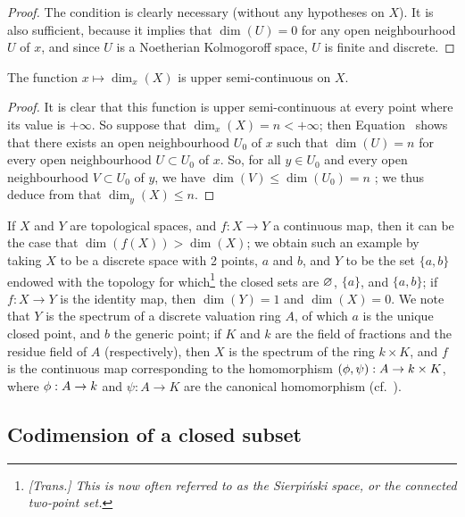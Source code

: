 \begin{proof}
The condition is clearly necessary (without any hypotheses on $X$).
It is also sufficient,
because it implies that $\dim(U)=0$ for any open neighbourhood $U$ of $x$, and since $U$ is a Noetherian Kolmogoroff space, $U$ is finite and discrete.
\end{proof}

\begin{proposition}[14.1.11]
\label{0.14.1.11}
The function $x\mapsto\dim_x(X)$ is upper semi-continuous on $X$.
\end{proposition}

\begin{proof}
It is clear that this function is upper semi-continuous at every point where its value is $+\infty$.
So suppose that $\dim_x(X)=n<+\infty$;
then Equation~ shows that there exists an open neighbourhood $U_0$ of $x$ such that $\dim(U)=n$ for every open neighbourhood $U\subset U_0$ of $x$.
So, for all $y\in U_0$ and every open neighbourhood $V\subset U_0$ of $y$, we have $\dim(V)\leq\dim(U_0)=n$ ;
we thus deduce from  that $\dim_y(X)\leq n$.
\end{proof}

\begin{remark}[14.1.12]
\label{0.14.1.12}
If $X$ and $Y$ are topological spaces, and $f:X\to Y$ a continuous map, then it can be the case that $\dim(f(X))>\dim(X)$;
we obtain such an example by taking $X$ to be a discrete space with 2 points, $a$ and $b$, and $Y$ to be the set $\{a,b\}$ endowed with the topology for which\footnote{\emph{[Trans.] This is now often referred to as the \emph{Sierpi\'nski space}, or the \emph{connected two-point set}.}} the closed sets are $\varnothing$, $\{a\}$, and $\{a,b\}$;
if $f:X\to Y$ is the identity map, then $\dim(Y)=1$ and $\dim(X)=0$.
We note that $Y$ is the spectrum of a discrete valuation ring $A$, of which $a$ is the unique closed point, and $b$ the generic point;
if $K$ and $k$ are the field of fractions and the residue field of $A$ (respectively), then $X$ is the spectrum of the ring $k\times K$, and $f$ is the continuous map corresponding to the homomorphism $(\vphi,\psi):A\to k\times K$, where $\vphi:A\to k$ and $\psi:A\to K$ are the canonical homomorphism (cf.~).
\end{remark}

\subsection{Codimension of a closed subset}
\label{subsection:0.14.2}


